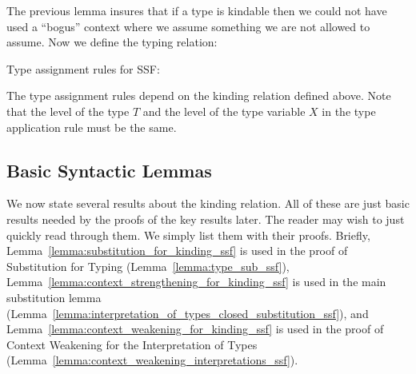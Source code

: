 \noindent
The previous lemma insures that if a type is kindable then we could
not have used a ``bogus'' context where we assume something we are not
allowed to assume.  Now we define the typing relation:
\begin{definition}
  \label{fig:typing_rules_ssf}
  Type assignment rules for SSF:
\end{definition}  
\noindent
The type assignment rules depend on the kinding relation defined
above.  Note that the level of the type $T$ and the level of the
type variable $X$ in the type application rule must be the same.

\subsection{Basic Syntactic Lemmas}
\label{subsec:basic_syntactic_lemmas}
We now state several results about the kinding relation. All of these
are just basic results needed by the proofs of the key results
later. The reader may wish to just quickly read through them.  We
simply list them with their proofs.  Briefly,
Lemma~\ref{lemma:substitution_for_kinding_ssf} is used in the proof of
Substitution for Typing (Lemma~\ref{lemma:type_sub_ssf}),
Lemma~\ref{lemma:context_strengthening_for_kinding_ssf} is used in the
main substitution lemma
(Lemma~\ref{lemma:interpretation_of_types_closed_substitution_ssf}),
and Lemma~\ref{lemma:context_weakening_for_kinding_ssf} is used in the
proof of Context Weakening for the Interpretation of Types
(Lemma~\ref{lemma:context_weakening_interpretations_ssf}).

